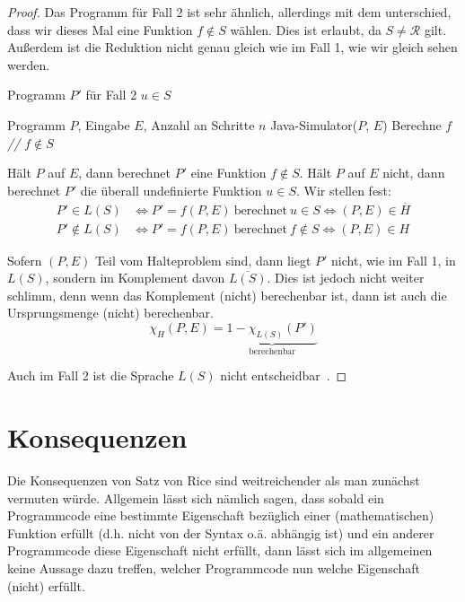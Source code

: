 \documentclass[journal]{IEEEtran}
\begin{document}
\begin{proof}
Das Programm für Fall 2 ist sehr ähnlich, allerdings mit dem unterschied, dass wir dieses Mal eine Funktion $f \notin S$ wählen. Dies ist erlaubt, da $S \ne \mathcal{R}$ gilt. Außerdem ist die Reduktion nicht genau gleich wie im Fall 1, wie wir gleich sehen werden.

\begin{algorithm}
\caption{Programm $P'$ für Fall 2 $u \in S$}
\begin{algorithmic}[1]
\renewcommand{\algorithmicrequire}{\textbf{Input:}}
\renewcommand{\algorithmicensure}{\textbf{Output:}}
\REQUIRE Programm $P$, Eingabe $E$, Anzahl an Schritte $n$
\STATE Java-Simulator($P$, $E$)
\STATE Berechne $f$ \textit{// $f \notin S$}
\end{algorithmic}
\end{algorithm}

Hält $P$ auf $E$, dann berechnet $P'$ eine Funktion $f \notin S$. Hält $P$ auf $E$ nicht, dann berechnet $P'$ die überall undefinierte Funktion $u \in S$. Wir stellen fest:
\begin{align*}
P' \in L(S) &\Leftrightarrow P' = f(P, E) \ \text{berechnet} \ u \in S \Leftrightarrow (P, E) \in \overline{H} \\
P' \notin L(S) &\Leftrightarrow P' = f(P, E) \ \text{berechnet} \ f \notin S \Leftrightarrow (P, E) \in H
\end{align*}

Sofern $(P, E)$ Teil vom Halteproblem sind, dann liegt $P'$ nicht, wie im Fall 1, in $L(S)$, sondern im Komplement davon $\overline{L(S)}$. Dies ist jedoch nicht weiter schlimm, denn wenn das Komplement (nicht) berechenbar ist, dann ist auch die Ursprungsmenge (nicht) berechenbar.
\begin{equation*}
\chi_{H}(P, E) = \underbrace{1 - \chi_{L(S)}(P')}_{\text{berechenbar}}
\end{equation*}

Auch im Fall 2 ist die Sprache $L(S)$ nicht entscheidbar~\cite{satzvonricebeweis}.

\end{proof}

\section{Konsequenzen}
\label{konsequenzen}

Die Konsequenzen von Satz von Rice sind weitreichender als man zunächst vermuten würde. Allgemein lässt sich nämlich sagen, dass sobald ein Programmcode eine bestimmte Eigenschaft bezüglich einer (mathematischen) Funktion erfüllt (d.h. nicht von der Syntax o.ä. abhängig ist) und ein anderer Programmcode diese Eigenschaft nicht erfüllt, dann lässt sich im allgemeinen keine Aussage dazu treffen, welcher Programmcode nun welche Eigenschaft (nicht) erfüllt.
\end{document}
